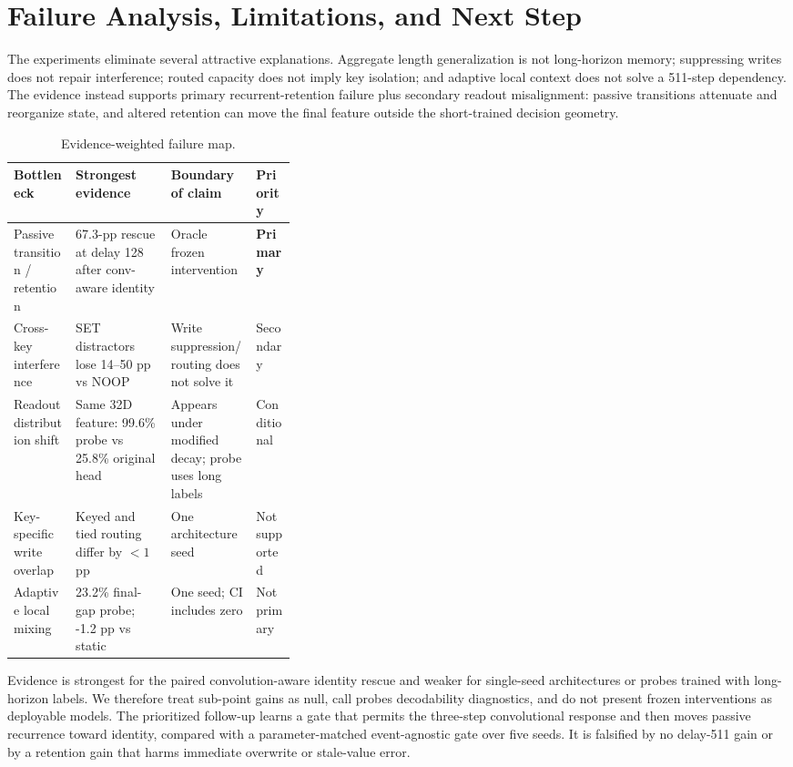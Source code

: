 \documentclass[10pt,a4paper]{article}
\begin{document}
\section{Failure Analysis, Limitations, and Next Step}
The experiments eliminate several attractive explanations. Aggregate length generalization is not long-horizon memory; suppressing writes does not repair interference; routed capacity does not imply key isolation; and adaptive local context does not solve a 511-step dependency. The evidence instead supports primary recurrent-retention failure plus secondary readout misalignment: passive transitions attenuate and reorganize state, and altered retention can move the final feature outside the short-trained decision geometry.
\begin{table}[!htbp]
\centering\small
\caption{Evidence-weighted failure map.}
\begin{tabularx}{\linewidth}{p{0.22\linewidth}Y Y p{0.14\linewidth}}
\toprule
Bottleneck & Strongest evidence & Boundary of claim & Priority \\
\midrule
Passive transition / retention & 67.3-pp rescue at delay 128 after conv-aware identity & Oracle frozen intervention & \textbf{Primary} \\
Cross-key interference & SET distractors lose 14--50 pp vs NOOP & Write suppression/routing does not solve it & Secondary \\
Readout distribution shift & Same 32D feature: 99.6\% probe vs 25.8\% original head & Appears under modified decay; probe uses long labels & Conditional \\
Key-specific write overlap & Keyed and tied routing differ by $<1$ pp & One architecture seed & Not supported \\
Adaptive local mixing & 23.2\% final-gap probe; -1.2 pp vs static & One seed; CI includes zero & Not primary \\
\bottomrule
\end{tabularx}
\end{table}

Evidence is strongest for the paired convolution-aware identity rescue and weaker for single-seed architectures or probes trained with long-horizon labels. We therefore treat sub-point gains as null, call probes decodability diagnostics, and do not present frozen interventions as deployable models. The prioritized follow-up learns a gate that permits the three-step convolutional response and then moves passive recurrence toward identity, compared with a parameter-matched event-agnostic gate over five seeds. It is falsified by no delay-511 gain or by a retention gain that harms immediate overwrite or stale-value error.
\end{document}
